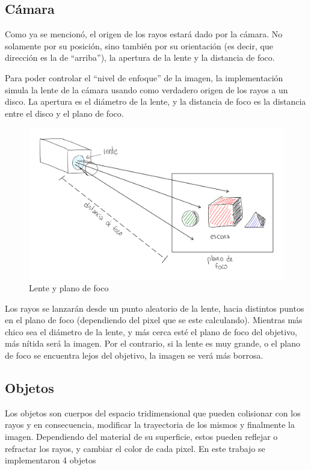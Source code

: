 \subsection{Cámara} \label{ssec:rt-camera}

Como ya se mencionó, el origen de los rayos estará dado por la cámara. No
solamente por su posición, sino también por su orientación (es decir, que
dirección es la de ``arriba''), la apertura de la lente y la distancia de foco.

Para poder controlar el ``nivel de enfoque'' de la imagen, la implementación
simula la lente de la cámara usando como verdadero origen de los rayos a un
disco. La apertura es el diámetro de la lente, y la distancia de foco
es la distancia entre el disco y el plano de foco.

\begin{figure}[H]
    \centering
    \includegraphics[width=.7\textwidth]{imgs/rt-camera-rays-through-lens.png}
    \caption{Lente y plano de foco}
    \label{fig:rt-camera-plano-foco}
\end{figure}

Los rayos se lanzarán desde un punto aleatorio de la lente, hacia distintos
puntos en el plano de foco (dependiendo del pixel que se este calculando).
Mientras más chico sea el diámetro de la lente, y más cerca esté el plano de
foco del objetivo, más nítida será la imagen. Por el contrario, si la lente es
muy grande, o el plano de foco se encuentra lejos del objetivo, la imagen se
verá más borrosa.

\subsection{Objetos}

Los objetos son cuerpos del espacio tridimensional que pueden colisionar con los
rayos y en consecuencia, modificar la trayectoria de los mismos y finalmente  la
imagen. Dependiendo del material de su superficie, estos pueden reflejar o
refractar los rayos, y cambiar el color de cada pixel. En este trabajo se
implementaron 4 objetos

